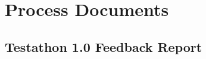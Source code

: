 \chapter{Process Documents}

\section{Testathon 1.0 Feedback Report}
\label{appendix: testathon_report_1}


